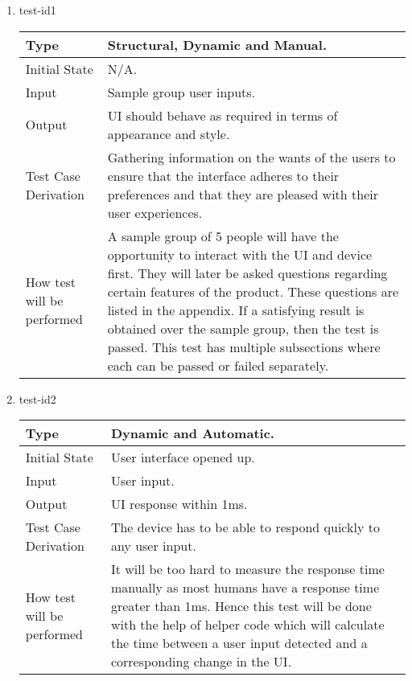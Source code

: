 \documentclass[12pt, titlepage]{article}
\begin{document}
\begin{enumerate}

\item{test-id1\\}

\begin{tabular}{ |p{5cm}||p{7cm}| }
    \hline
    Type & Structural, Dynamic and Manual. \\
    \hline
    Initial State  &  N/A. \\
    \hline
    Input &   Sample group user inputs. \\
    \hline
    Output &   UI should behave as required in terms of appearance and style.  \\
    \hline
    Test Case Derivation &   Gathering information on the wants of the users to ensure that the interface adheres to their preferences and that they are pleased with their user experiences. \\
    \hline
    How test will be performed & A sample group of 5 people will have the opportunity to interact with the UI and device first. They will later be asked questions regarding certain features of the product. These questions are listed in the appendix. If a satisfying result is obtained over the sample group, then the test is passed. This test has multiple subsections where each can be passed or failed separately. \\
    \hline
\end{tabular}

\item{test-id2\\}

\begin{tabular}{ |p{5cm}||p{7cm}| }
    \hline
    Type & Dynamic and Automatic. \\
    \hline
    Initial State  &  User interface opened up. \\
    \hline
    Input &   User input. \\
    \hline
    Output &   UI response within 1ms.  \\
    \hline
    Test Case Derivation &   The device has to be able to respond quickly to any user input. \\
    \hline
    How test will be performed & It will be too hard to measure the response time manually as most humans have a response time greater than 1ms. Hence this test will be done with the help of helper code which will calculate the time between a user input detected and a corresponding change in the UI. \\
    \hline
\end{tabular}


\end{enumerate}
\end{document}

